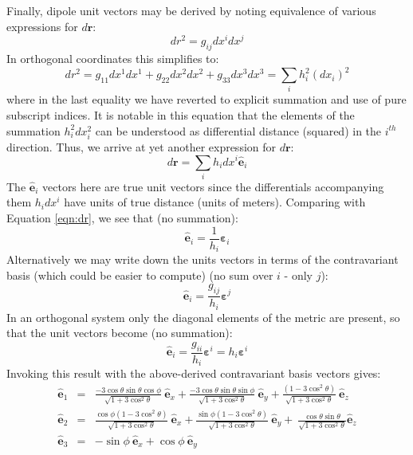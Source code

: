 \documentclass[11pt,letterpaper]{article}
\begin{document}
Finally, dipole unit vectors may be derived by noting equivalence of various expressions for $d \mathbf{r}$:
\begin{equation}
dr^2 = g_{ij} dx^i dx^j
\end{equation}
In orthogonal coordinates this simplifies to:
\begin{equation}
dr ^2 = g_{11} dx^1 dx^1 + g_{22} dx^2 dx^2 + g_{33} dx^3 dx^3 = \sum_i h_i^2 (dx_i)^2
\end{equation}
where in the last equality we have reverted to explicit summation and use of pure subscript indices.  It is notable in this equation that the elements of the summation $h_i^2 dx_i^2$ can be understood as differential distance (squared) in the $i^{th}$ direction.  Thus, we arrive at yet another expression for $d \mathbf{r}$:
\begin{equation}
d \mathbf{r} = \sum_i h_i dx^i \hat{\mathbf{e}}_i
\end{equation}
The $\hat{\mathbf{e}}_i$ vectors here are true unit vectors since the differentials accompanying them $h_i dx^i$ have units of true distance (units of meters).  Comparing with Equation \ref{eqn:dr}, we see that (no summation):
\begin{equation}
\hat{\mathbf{e}}_i = \frac{1}{h_i} \boldsymbol{\varepsilon}_i
\end{equation}
Alternatively we may write down the units vectors in terms of the contravariant basis (which could be easier to compute) (no sum over $i$ - only $j$):
\begin{equation}
\hat{\mathbf{e}}_i = \frac{g_{ij}}{h_i} \boldsymbol{\varepsilon}^j
\end{equation}
In an orthogonal system only the diagonal elements of the metric are present, so that the unit vectors become (no summation):
\begin{equation}
\hat{\mathbf{e}}_i = \frac{g_{ii}}{h_i} \boldsymbol{\varepsilon}^i = h_i \boldsymbol{\varepsilon}^i 
\end{equation}
Invoking this result with the above-derived contravariant basis vectors gives:
\begin{eqnarray}
\hat{\mathbf{e}}_1 &=& \frac{-3 \cos \theta \sin \theta \cos \phi}{\sqrt{1+3 \cos^2 \theta } } ~ \hat{\mathbf{e}}_x + \frac{-3 \cos \theta \sin \theta \sin \phi}{\sqrt{1+3 \cos^2 \theta } } ~ \hat{\mathbf{e}}_y + \frac{\left( 1 - 3 \cos^2 \theta \right) }{\sqrt{1+3 \cos^2 \theta } }~ \hat{\mathbf{e}}_z \\
\hat{\mathbf{e}}_2 &=& \frac{\cos \phi \left(1 - 3 \cos^2 \theta \right)}{\sqrt{1 + 3 \cos^2 \theta}} ~ \hat{\mathbf{e}}_x + \frac{\sin \phi \left(1 - 3 \cos^2 \theta \right)}{\sqrt{1 + 3 \cos^2 \theta}}~ \hat{\mathbf{e}}_y + ~  \frac{\cos \theta \sin \theta}{\sqrt{1+3 \cos^2 \theta }} \hat{\mathbf{e}}_z \\
\hat{\mathbf{e}}_3 &=& - \sin \phi ~ \hat{\mathbf{e}}_x + \cos \phi ~ \hat{\mathbf{e}}_y
\end{eqnarray}
\end{document}
